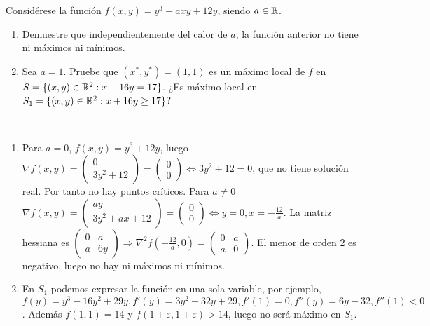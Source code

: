 \documentclass[twoside]{article}
\begin{document}
\begin{ejercicio}{10}
Considérese la función $f(x,y)=y^3+axy+12y$, siendo $a\in\mathbb{R}$.
\begin{enumerate}
\item Demuestre que independientemente del calor de $a$, la función anterior no tiene ni máximos ni mínimos.
\item Sea $a=1$. Pruebe que $(x^*,y^*)=(1,1)$ es un máximo local de $f$ en $S=\{(x,y)\in\mathbb{R}^2:x+16y=17\}$. ¿Es máximo local en $S_1=\{(x,y)\in\mathbb{R}^2:x+16y\geq 17\}$?
\end{enumerate}

\begin{solucion}\
\begin{enumerate}
\item Para $a=0$, $f(x,y)=y^3+12y$, luego $\nabla f(x,y)=\begin{pmatrix}
0\\
3y^2+12
\end{pmatrix}=\begin{pmatrix}
0\\
0
\end{pmatrix}\Leftrightarrow 3y^2+12=0$, que no tiene solución real. Por tanto no hay puntos críticos.
Para $a\neq 0$ $\nabla f(x,y)=\begin{pmatrix}
ay\\
3y^2+ax+12
\end{pmatrix}=\begin{pmatrix}
0\\
0
\end{pmatrix}\Leftrightarrow y=0,x=-\frac{12}{a}$. La matriz hessiana es $\begin{pmatrix}
0 & a\\
a & 6y
\end{pmatrix}\Rightarrow \nabla^2 f(-\frac{12}{a},0)=\begin{pmatrix}
0 & a\\
a & 0
\end{pmatrix}$. El menor de orden 2 es negativo, luego no hay ni máximos ni mínimos.
\item En $S_1$ podemos expresar la función en una sola variable, por ejemplo, $f(y)=y^3-16y^2+29y, f'(y)=3y^2-32y+29, f'(1)=0, f''(y)=6y-32,f''(1)<0$.
Además $f(1,1)=14$ y $f(1+\varepsilon,1+\varepsilon)>14$, luego no será máximo en $S_1$.
\end{enumerate}
\end{solucion}
\end{ejercicio}

\newpage 
\end{document}
